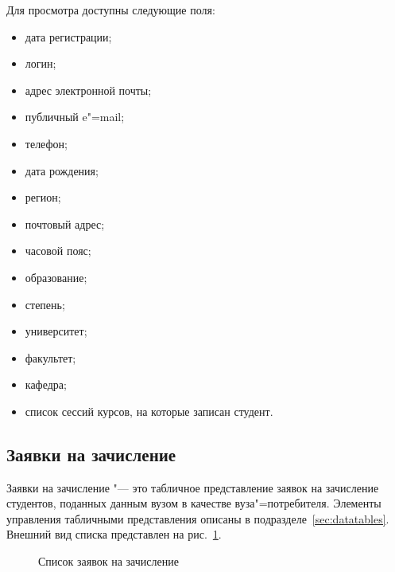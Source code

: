 Для просмотра доступны следующие поля:
\begin{itemize}
	\item дата регистрации;
	\item логин;
	\item адрес электронной почты;
	\item публичный e"=mail;
	\item телефон;
	\item дата рождения;
	\item регион;
	\item почтовый адрес;
	\item часовой пояс;
	\item образование;
	\item степень;
	\item университет;
	\item факультет;
	\item кафедра;
	\item список сессий курсов, на которые записан студент.
\end{itemize}

\subsection{Заявки на зачисление}

Заявки на зачисление "--- это табличное представление заявок на зачисление студентов, 
поданных данным вузом в качестве вуза"=потребителя. 
Элементы управления табличными представления описаны в подразделе~\ref{sec:datatables}.
Внешний вид списка представлен на рис.~\ref{img:student:enroll_req_list}. 

\begin{figure}[H]
	\caption{Список заявок на зачисление}
	\label{img:student:enroll_req_list}
\end{figure}

